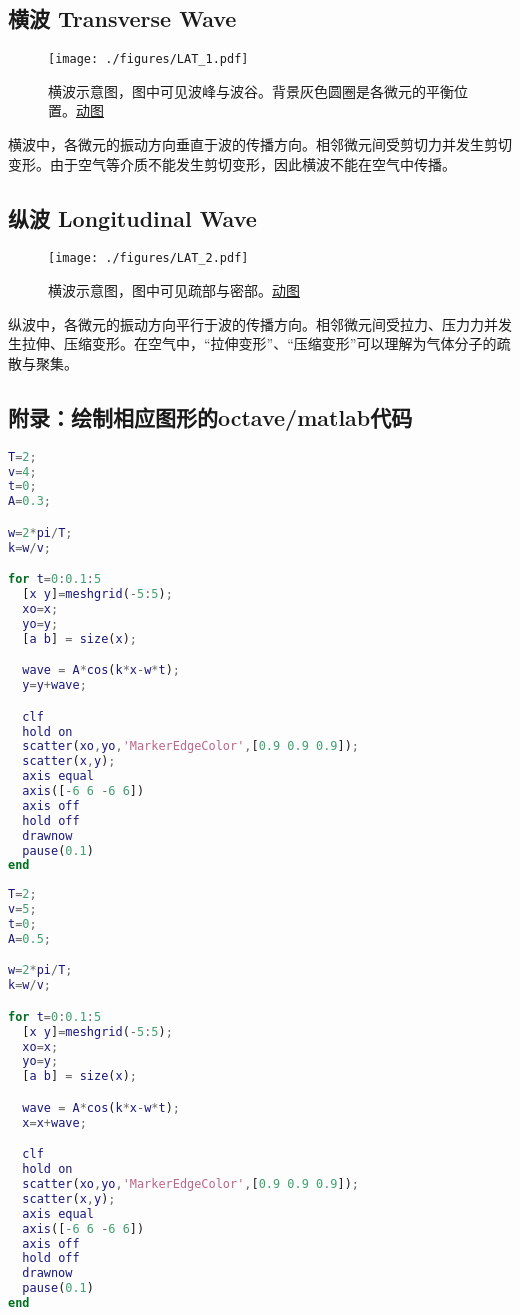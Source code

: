 
\subsection{横波 Transverse Wave}
\begin{figure}[ht]
\centering
\texttt{[image: ./figures/LAT\_1.pdf]}
\caption{横波示意图，图中可见波峰与波谷。背景灰色圆圈是各微元的平衡位置。\href{https://wuli.wiki/apps/waves.html}{动图}} \label{LAT_fig1}
\end{figure}
横波中，各微元的振动方向垂直于波的传播方向。相邻微元间受剪切力并发生剪切变形。由于空气等介质不能发生剪切变形，因此横波不能在空气中传播。

\subsection{纵波 Longitudinal Wave}
\begin{figure}[ht]
\centering
\texttt{[image: ./figures/LAT\_2.pdf]}
\caption{横波示意图，图中可见疏部与密部。\href{https://wuli.wiki/apps/waves.html}{动图}} \label{LAT_fig2}
\end{figure}
纵波中，各微元的振动方向平行于波的传播方向。相邻微元间受拉力、压力力并发生拉伸、压缩变形。在空气中，“拉伸变形”、“压缩变形”可以理解为气体分子的疏散与聚集。

\subsection{附录：绘制相应图形的octave/matlab代码}
\begin{lstlisting}[language=matlab]
%绘制横波
T=2;
v=4;
t=0;
A=0.3;

w=2*pi/T;
k=w/v;

for t=0:0.1:5
  [x y]=meshgrid(-5:5);
  xo=x;
  yo=y;
  [a b] = size(x);

  wave = A*cos(k*x-w*t);
  y=y+wave;

  clf
  hold on
  scatter(xo,yo,'MarkerEdgeColor',[0.9 0.9 0.9]);
  scatter(x,y);
  axis equal
  axis([-6 6 -6 6])
  axis off
  hold off
  drawnow
  pause(0.1)
end

\end{lstlisting}

\begin{lstlisting}[language=matlab]
%绘制纵波
T=2;
v=5;
t=0;
A=0.5;

w=2*pi/T;
k=w/v;

for t=0:0.1:5
  [x y]=meshgrid(-5:5);
  xo=x;
  yo=y;
  [a b] = size(x);

  wave = A*cos(k*x-w*t);
  x=x+wave;

  clf
  hold on
  scatter(xo,yo,'MarkerEdgeColor',[0.9 0.9 0.9]);
  scatter(x,y);
  axis equal
  axis([-6 6 -6 6])
  axis off
  hold off
  drawnow
  pause(0.1)
end
\end{lstlisting}
